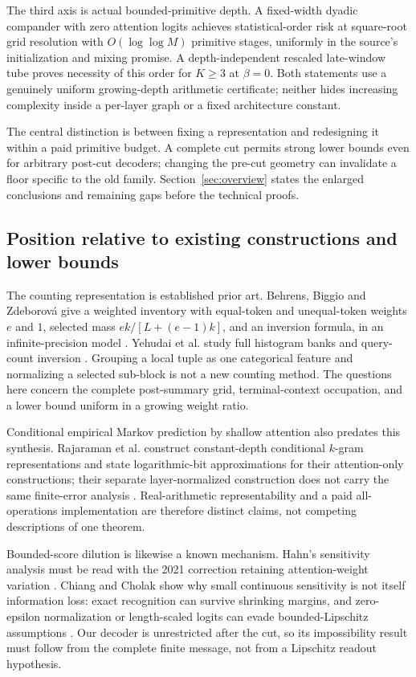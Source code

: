 \documentclass[11pt,letterpaper]{article}
\theoremstyle{definition}\newtheorem{definition}[theorem]{Definition}
\theoremstyle{remark}\newtheorem{remark}[theorem]{Remark}
\begin{document}
The third axis is actual bounded-primitive depth. A fixed-width dyadic compander with zero attention logits achieves statistical-order risk at square-root grid resolution with $O(\log\log M)$ primitive stages, uniformly in the source's initialization and mixing promise. A depth-independent rescaled late-window tube proves necessity of this order for $K\ge3$ at $\beta=0$. Both statements use a genuinely uniform growing-depth arithmetic certificate; neither hides increasing complexity inside a per-layer graph or a fixed architecture constant.

The central distinction is between fixing a representation and redesigning it within a paid primitive budget. A complete cut permits strong lower bounds even for arbitrary post-cut decoders; changing the pre-cut geometry can invalidate a floor specific to the old family. Section~\ref{sec:overview} states the enlarged conclusions and remaining gaps before the technical proofs.

\subsection{Position relative to existing constructions and lower bounds}
The counting representation is established prior art. Behrens, Biggio and Zdeborov\'a give a weighted inventory with equal-token and unequal-token weights $e$ and $1$, selected mass $ek/[L+(e-1)k]$, and an inversion formula, in an infinite-precision model \citep[Appendix B.3]{behrens2025}. Yehudai et al. study full histogram banks and query-count inversion \citep[Sections 4.1--4.2]{yehudai2026}. Grouping a local tuple as one categorical feature and normalizing a selected sub-block is not a new counting method. The questions here concern the complete post-summary grid, terminal-context occupation, and a lower bound uniform in a growing weight ratio.

Conditional empirical Markov prediction by shallow attention also predates this synthesis. Rajaraman et al. construct constant-depth conditional $k$-gram representations and state logarithmic-bit approximations for their attention-only constructions; their separate layer-normalized construction does not carry the same finite-error analysis \citep[Theorems 4.4 and 5.1; Remarks 4.2 and 5.2]{rajaraman2024}. Real-arithmetic representability and a paid all-operations implementation are therefore distinct claims, not competing descriptions of one theorem.

Bounded-score dilution is likewise a known mechanism. Hahn's sensitivity analysis must be read with the 2021 correction retaining attention-weight variation \citep{hahn2020,hahn2021supp}. Chiang and Cholak show why small continuous sensitivity is not itself information loss: exact recognition can survive shrinking margins, and zero-epsilon normalization or length-scaled logits can evade bounded-Lipschitz assumptions \citep{chiang2022}. Our decoder is unrestricted after the cut, so its impossibility result must follow from the complete finite message, not from a Lipschitz readout hypothesis.
\end{document}
